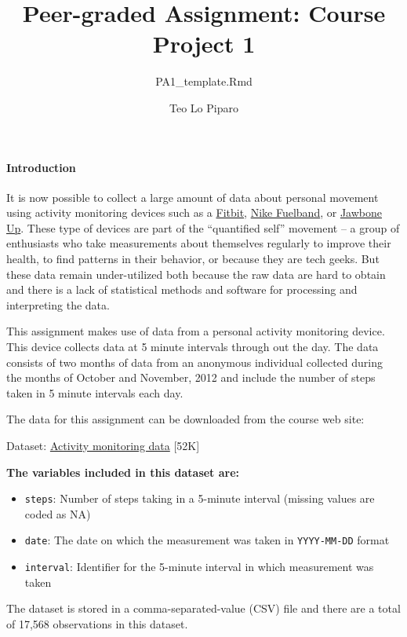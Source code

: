 \documentclass[
]{article}
\title{Peer-graded Assignment: Course Project 1}
\subtitle{PA1\_template.Rmd}
\author{Teo Lo Piparo}
\date{}
\providecommand{\tightlist}{%
  \setlength{\itemsep}{0pt}\setlength{\parskip}{0pt}}
\begin{document}
\maketitle

\hypertarget{introduction}{%
\paragraph{Introduction}\label{introduction}}

It is now possible to collect a large amount of data about personal
movement using activity monitoring devices such as a
\href{http://www.fitbit.com/}{Fitbit},
\href{http://www.nike.com/us/en_us/c/nikeplus-fuelband}{Nike Fuelband},
or \href{https://jawbone.com/up}{Jawbone Up}. These type of devices are
part of the ``quantified self'' movement -- a group of enthusiasts who
take measurements about themselves regularly to improve their health, to
find patterns in their behavior, or because they are tech geeks. But
these data remain under-utilized both because the raw data are hard to
obtain and there is a lack of statistical methods and software for
processing and interpreting the data.

This assignment makes use of data from a personal activity monitoring
device. This device collects data at 5 minute intervals through out the
day. The data consists of two months of data from an anonymous
individual collected during the months of October and November, 2012 and
include the number of steps taken in 5 minute intervals each day.

The data for this assignment can be downloaded from the course web site:

Dataset:
\href{https://d396qusza40orc.cloudfront.net/repdata\%2Fdata\%2Factivity.zip}{Activity
monitoring data} {[}52K{]}

\textbf{The variables included in this dataset are:}

\begin{itemize}
\tightlist
\item
  \texttt{steps}: Number of steps taking in a 5-minute interval (missing
  values are coded as \color{red}{\verb|NA|}NA)
\item
  \texttt{date}: The date on which the measurement was taken in
  \texttt{YYYY-MM-DD} format
\item
  \texttt{interval}: Identifier for the 5-minute interval in which
  measurement was taken
\end{itemize}

The dataset is stored in a comma-separated-value (CSV) file and there
are a total of 17,568 observations in this dataset.
\end{document}

